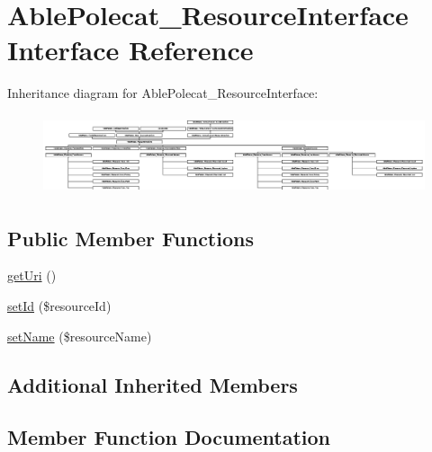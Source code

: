 \hypertarget{interface_able_polecat___resource_interface}{}\section{Able\+Polecat\+\_\+\+Resource\+Interface Interface Reference}
\label{interface_able_polecat___resource_interface}
Inheritance diagram for Able\+Polecat\+\_\+\+Resource\+Interface\+:\begin{figure}[H]
\begin{center}
\leavevmode
\includegraphics[height=2.347561cm]{interface_able_polecat___resource_interface}
\end{center}
\end{figure}
\subsection*{Public Member Functions}
\begin{DoxyCompactItemize}
\item 
\hyperlink{interface_able_polecat___resource_interface_a2ac86cae38fbe15a019d075d485ab702}{get\+Uri} ()
\item 
\hyperlink{interface_able_polecat___resource_interface_aea086c97a20cf305b4a73485fd11763b}{set\+Id} (\$resource\+Id)
\item 
\hyperlink{interface_able_polecat___resource_interface_a396944828c457deecbba6acb9bee6abf}{set\+Name} (\$resource\+Name)
\end{DoxyCompactItemize}
\subsection*{Additional Inherited Members}


\subsection{Member Function Documentation}
\hypertarget{interface_able_polecat___resource_interface_a2ac86cae38fbe15a019d075d485ab702}{}
